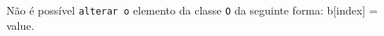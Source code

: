 \documentclass[12pt,varwidth=16cm,border=1pt]{standalone}
\begin{document}
Não é possível \verb+alterar o+ elemento da classe \verb+O+ da seguinte forma: b[index] = value.

\questiomfalse
\end{document}
